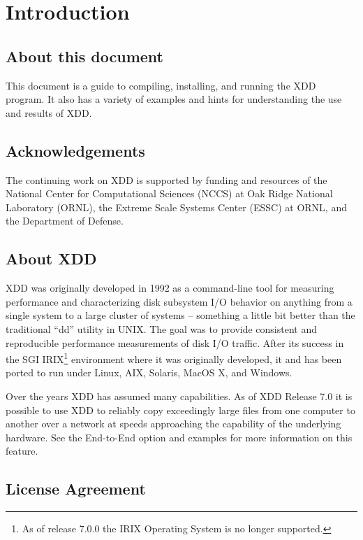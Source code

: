 \section{Introduction}\label{introduction}

\subsection{About this document}\label{about-this-document}

This document is a guide to compiling, installing, and running the XDD program. It also has a variety of examples and hints for understanding the use and results of XDD.

\subsection{\texorpdfstring{Acknowledgements }{Acknowledgements }}\label{acknowledgements}

The continuing work on XDD is supported by funding and resources of the National Center for Computational Sciences (NCCS) at Oak Ridge National Laboratory (ORNL), the Extreme Scale Systems Center (ESSC) at ORNL, and the Department of Defense.

\subsection{About XDD}\label{about-xdd}

XDD was originally developed in 1992 as a command-line tool for measuring performance and characterizing disk subsystem I/O behavior on anything from a single system to a large cluster of systems -- something a little bit better than the traditional ``dd'' utility in UNIX. The goal was to provide consistent and reproducible performance measurements of disk I/O traffic. After its success in the SGI IRIX\footnote{As of release 7.0.0 the IRIX Operating System is no longer supported.} environment where it was originally developed, it and has been ported to run under Linux, AIX, Solaris, MacOS X, and Windows.

Over the years XDD has assumed many capabilities. As of XDD Release 7.0 it is possible to use XDD to reliably copy exceedingly large files from one computer to another over a network at speeds approaching the capability of the underlying hardware. See the End-to-End option and examples for more information on this feature.

\subsection{License Agreement}\label{license-agreement}

